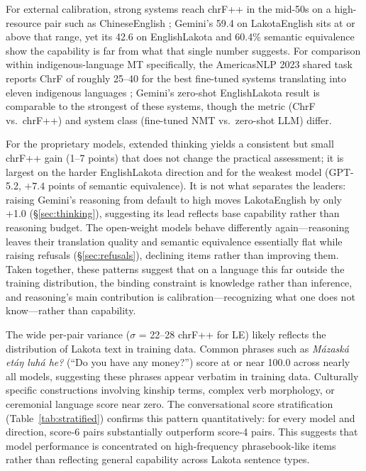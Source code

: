 \documentclass[11pt]{article}
\newcommand{\lak}[1]{\textit{#1}}
\begin{document}
For external calibration, strong systems reach chrF++ in the mid-50s on a high-resource pair such as Chinese\textrightarrow English \cite{jiao2023}; Gemini's 59.4 on Lakota\textrightarrow English sits at or above that range, yet its 42.6 on English\textrightarrow Lakota and 60.4\% semantic equivalence show the capability is far from what that single number suggests. For comparison within indigenous-language MT specifically, the AmericasNLP 2023 shared task reports ChrF of roughly 25--40 for the best fine-tuned systems translating into eleven indigenous languages \cite{americasnlp2023}; Gemini's zero-shot English\textrightarrow Lakota result is comparable to the strongest of these systems, though the metric (ChrF vs.\ chrF++) and system class (fine-tuned NMT vs.\ zero-shot LLM) differ.

For the proprietary models, extended thinking yields a consistent but small chrF++ gain (1--7 points) that does not change the practical assessment; it is largest on the harder English\textrightarrow Lakota direction and for the weakest model (GPT-5.2, $+7.4$ points of semantic equivalence). It is not what separates the leaders: raising Gemini's reasoning from default to high moves Lakota\textrightarrow English by only +1.0 (\S\ref{sec:thinking}), suggesting its lead reflects base capability rather than reasoning budget. The open-weight models behave differently again---reasoning leaves their translation quality and semantic equivalence essentially flat while raising refusals (\S\ref{sec:refusals}), declining items rather than improving them. Taken together, these patterns suggest that on a language this far outside the training distribution, the binding constraint is knowledge rather than inference, and reasoning's main contribution is calibration---recognizing what one does not know---rather than capability.

The wide per-pair variance ($\sigma$ = 22--28 chrF++ for L\textrightarrow E) likely reflects the distribution of Lakota text in training data. Common phrases such as \lak{Mázaská etáŋ luhá he?} (``Do you have any money?'') score at or near 100.0 across nearly all models, suggesting these phrases appear verbatim in training data. Culturally specific constructions involving kinship terms, complex verb morphology, or ceremonial language score near zero. The conversational score stratification (Table~\ref{tab:stratified}) confirms this pattern quantitatively: for every model and direction, score-6 pairs substantially outperform score-4 pairs. This suggests that model performance is concentrated on high-frequency phrasebook-like items rather than reflecting general capability across Lakota sentence types.
\end{document}
